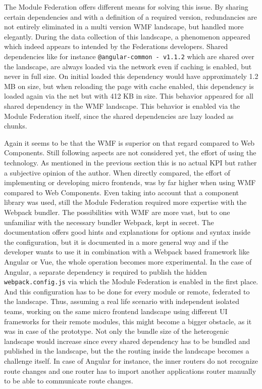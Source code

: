 The Module Federation offers different means for solving this issue. By sharing certain dependencies and with a definition of a required version, redundancies are not entirely eliminated in a multi version WMF landscape, but handled more elegantly. During the data collection of this landscape, a phenomenon appeared which indeed appears to intended by the Federations developers. Shared dependencies like for instance \texttt{@angular-common - v1.1.2} which are shared over the landscape, are always loaded via the network even if caching is enabled, but never in full size. On initial loaded this dependency would have approximately 1.2 MB on size, but when reloading the page with cache enabled, this dependency is loaded again via the net but with 412 KB in size.
This behavior appeared for all shared dependency in the WMF landscape. This behavior is enabled via the Module Federation itself, since the shared dependencies are lazy loaded as chunks. \cite{wmf_the_good_and_ugly}

Again it seems to be that the WMF is superior on that regard compared to Web Components. Still following aspects are not considered yet, the effort of using the technology. As mentioned in the previous section this is no actual KPI but rather a subjective opinion of the author. When directly compared, the effort of implementing or developing micro frontends, was by far higher when using WMF compared to Web Components. Even taking into account that a component library was used, still the Module Federation required more expertise with the Webpack bundler.
The possibilities with WMF are more vast, but to one unfamiliar with the necessary bundler Webpack, kept in secret. The documentation offers good hints and explanations for options and syntax inside the configuration, but it is documented in a more general way and if the developer wants to use it in combination with a Webpack based framework like Angular or Vue, the whole operation becomes more experimental. In the case of Angular, a separate dependency is required to publish the hidden \texttt{webpack.config.js} via which the Module Federation is enabled in the first place. And this configuration has to be done for every module or remote, federated to the landscape. Thus, assuming a real life scenario with independent isolated teams, working on the same micro frontend landscape using different UI frameworks for their remote modules, this might become a bigger obstacle, as it was in case of the prototype. Not only the bundle size of the heterogenic landscape would increase since every shared dependency has to be bundled and published in the landscape, but the the routing inside the landscape becomes a challenge itself. In case of Angular for instance, the inner routers do not recognize route changes and one router has to import another applications router manually to be able to communicate route changes.\cite{wmf_the_good_and_ugly}

